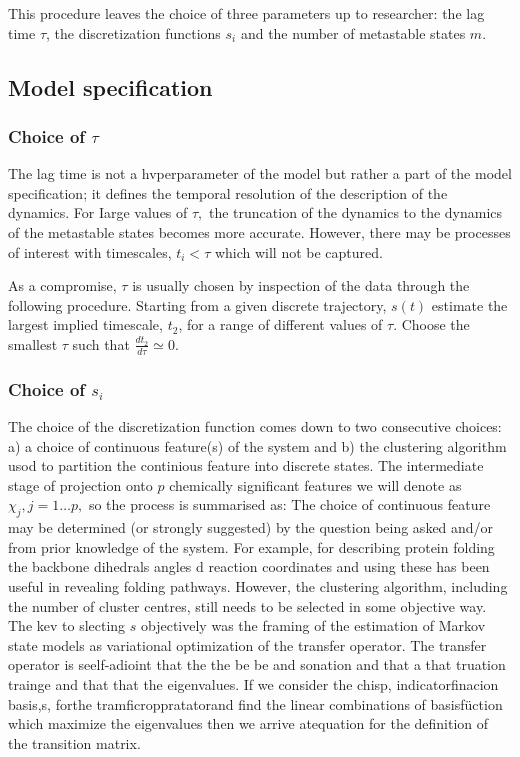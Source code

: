 This procedure leaves the choice of three parameters up to researcher: the lag time $\tau$, the discretization functions $s_{i}$ and the number of metastable states $m$.

\subsection{Model specification}
\subsubsection{Choice of $\tau$}
 The lag time is not a hvperparameter of the model but rather a part of the model specification; it defines the temporal resolution of the description of the dynamics. For
Iarge values of $\tau,$ the truncation of the dynamics to the dynamics of the metastable states becomes more accurate. However, there may be processes of interest with timescales, $t_{i}<\tau$ which will not be captured.

As a compromise, $\tau$ is usually chosen by inspection of the data through the following procedure. Starting from a given discrete trajectory, $s(t)$ estimate the largest implied timescale, $t_{2}$, for a range of different values of $\tau$. Choose the smallest $\tau$ such that $\frac{d t_{2}}{d \tau} \simeq 0$. 

\subsubsection{Choice of $s_i$}
The choice of the discretization function comes down to two consecutive choices: a) a choice of continuous feature(s) of the system and b) the clustering algorithm usod to partition the continious feature into discrete states. The intermediate stage of projection onto $p$ chemically significant features we will denote as $\chi_{j}, j=1 \ldots p,$ so the process is summarised as:
The choice of continuous feature may be determined (or strongly suggested) by the question being asked and/or from prior knowledge of the system. For example, for describing protein folding the backbone dihedrals angles d reaction coordinates and using these has been useful in revealing folding pathways. However, the clustering algorithm, including the number of cluster centres, still needs to be selected in some objective way. The kev to slecting $s$ objectively was the framing of the estimation of Markov state models as variational optimization of the transfer operator. The transfer operator is seelf-adioint that the the be be and sonation and that a that truation trainge and that that the eigenvalues. If we consider the chisp, indicatorfinacion basis,s, forthe tramficroppratatorand find the linear combinations of basisfüction which maximize the eigenvalues then we arrive atequation for the definition of the transition matrix.


